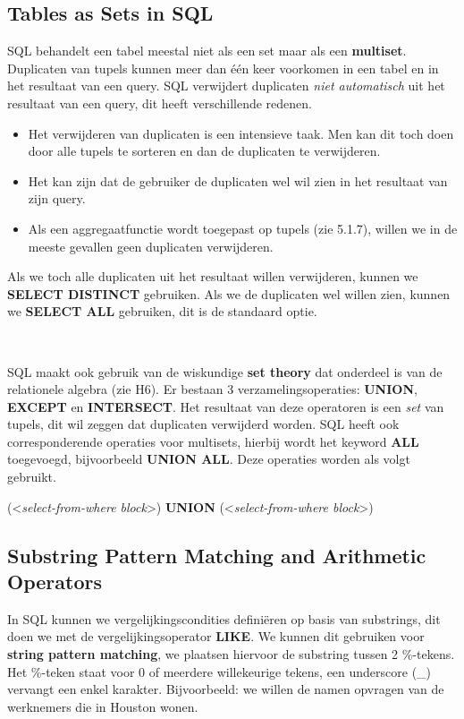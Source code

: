 \subsection{Tables as Sets in SQL}
SQL behandelt een tabel meestal niet als een set maar als een \textbf{multiset}. Duplicaten van tupels kunnen meer dan \'e\'en keer voorkomen in een tabel en in het resultaat van een query. SQL verwijdert duplicaten \textit{niet automatisch} uit het resultaat van een query, dit heeft verschillende redenen.
\begin{itemize}
\item Het verwijderen van duplicaten is een intensieve taak. Men kan dit toch doen door alle tupels te sorteren en dan de duplicaten te verwijderen.
\item Het kan zijn dat de gebruiker de duplicaten wel wil zien in het resultaat van zijn query.
\item Als een aggregaatfunctie wordt toegepast op tupels (zie 5.1.7), willen we in de meeste gevallen geen duplicaten verwijderen. 
\end{itemize}
Als we toch alle duplicaten uit het resultaat willen verwijderen, kunnen we \textbf{SELECT DISTINCT} gebruiken. Als we de duplicaten wel willen zien, kunnen we \textbf{SELECT ALL} gebruiken, dit is de standaard optie.

~

\noindent SQL maakt ook gebruik van de wiskundige \textbf{set theory} dat onderdeel is van de relationele algebra (zie H6). Er bestaan 3 verzamelingsoperaties: \textbf{UNION}, \textbf{EXCEPT} en \textbf{INTERSECT}. Het resultaat van deze operatoren is een \textit{set} van tupels, dit wil zeggen dat duplicaten verwijderd worden. SQL heeft ook corresponderende operaties voor multisets, hierbij wordt het keyword \textbf{ALL} toegevoegd, bijvoorbeeld \textbf{UNION ALL}. Deze operaties worden als volgt gebruikt.

\vspace{1mm}\hspace{10mm}
({\textless}\textit{select-from-where block}{\textgreater}) \textbf{UNION} ({\textless}\textit{select-from-where block}{\textgreater})

\subsection{Substring Pattern Matching and Arithmetic Operators}

In SQL kunnen we vergelijkingscondities defini\"eren op basis van substrings, dit doen we met de vergelijkingsoperator \textbf{LIKE}. We kunnen dit gebruiken voor \textbf{string pattern matching}, we plaatsen hiervoor de substring tussen 2 \%-tekens. Het \%-teken staat voor 0 of meerdere willekeurige tekens, een underscore (\_) vervangt een enkel karakter. Bijvoorbeeld: we willen de namen opvragen van de werknemers die in Houston wonen.


